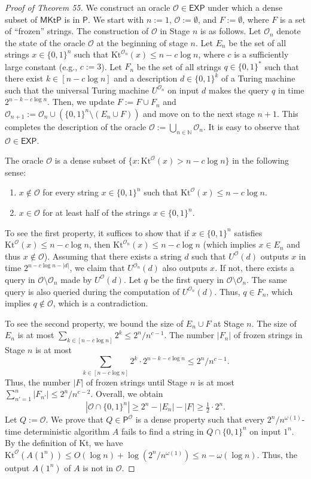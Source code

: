 \documentclass[10pt,a4paper]{article}
\begin{document}
\begin{proof}[Proof of Theorem 55]
We construct an oracle $\mathcal O\in\mathsf{EXP}$ under which a dense subset of $\mathsf{MKtP}$ is in $\mathsf P$. We start with $n:=1$, $\mathcal O:=\emptyset$, and $F:=\emptyset$, where $F$ is a set of ``frozen'' strings. The construction of $\mathcal O$ in Stage $n$ is as follows. Let $\mathcal O_n$ denote the state of the oracle $\mathcal O$ at the beginning of stage $n$. Let $E_n$ be the set of all strings $x\in\{0,1\}^n$ such that $\mathrm{Kt}^{\mathcal O_n}(x)\leq n-c\log n$, where $c$ is a sufficiently large constant (e.g., $c:=3$). Let $F_n$ be the set of all strings $q\in\{0,1\}^*$ such that there exist $k\in[n-c\log n]$ and a description $d\in\{0,1\}^k$ of a Turing machine such that the universal Turing machine $U^{\mathcal O_n}$ on input $d$ makes the query $q$ in time $2^{n-k-c\log n}$. Then, we update $F:=F\cup F_n$ and $\mathcal O_{n+1}:=\mathcal O_n\cup(\{0,1\}^n\setminus(E_n\cup F))$ and move on to the next stage $n+1$. This completes the description of the oracle $\mathcal O:=\bigcup_{n\in\mathbb N}\mathcal O_n$. It is easy to observe that $\mathcal O\in\mathsf{EXP}$.

The oracle $\mathcal O$ is a dense subset of $\{x:\mathrm{Kt}^{\mathcal O}(x)>n-c\log n\}$ in the following sense:
\begin{enumerate}
\item $x\notin\mathcal O$ for every string $x\in\{0,1\}^n$ such that $\mathrm{Kt}^{\mathcal O}(x)\leq n-c\log n$.
\item $x\in\mathcal O$ for at least half of the strings $x\in\{0,1\}^n$.
\end{enumerate}
To see the first property, it suffices to show that if $x\in\{0,1\}^n$ satisfies $\mathrm{Kt}^{\mathcal O}(x)\leq n-c\log n$, then $\mathrm{Kt}^{\mathcal O_n}(x)\leq n-c\log n$ (which implies $x\in E_n$ and thus $x\notin\mathcal O$). Assuming that there exists a string $d$ such that $U^{\mathcal O}(d)$ outputs $x$ in time $2^{n-c\log n-|d|}$, we claim that $U^{\mathcal O_n}(d)$ also outputs $x$. If not, there exists a query in $\mathcal O\setminus\mathcal O_n$ made by $U^{\mathcal O}(d)$. Let $q$ be the first query in $\mathcal O\setminus\mathcal O_n$. The same query is also queried during the computation of $U^{\mathcal O_n}(d)$. Thus, $q\in F_n$, which implies $q\notin\mathcal O$, which is a contradiction.

To see the second property, we bound the size of $E_n\cup F$ at Stage $n$. The size of $E_n$ is at most $\sum_{k\in[n-c\log n]}2^k\leq2^n/n^{c-1}$. The number $|F_n|$ of frozen strings in Stage $n$ is at most
\[\sum_{k\in[n-c\log n]}2^k\cdot2^{n-k-c\log n}\leq2^n/n^{c-1}.\]
Thus, the number $|F|$ of frozen strings until Stage $n$ is at most $\sum_{n'=1}^n|F_{n'}|\leq2^n/n^{c-2}$. Overall, we obtain
\[|\mathcal O\cap\{0,1\}^n|\geq2^n-|E_n|-|F|\geq\tfrac12\cdot2^n.\]
Let $Q:=\mathcal O$. We prove that $Q\in\mathsf P^{\mathcal O}$ is a dense property such that every $2^n/n^{\omega(1)}$-time deterministic algorithm $A$ fails to find a string in $Q\cap\{0,1\}^n$ on input $1^n$. By the definition of Kt, we have $\mathrm{Kt}^{\mathcal O}(A(1^n))\leq O(\log n)+\log(2^n/n^{\omega(1)})\leq n-\omega(\log n)$. Thus, the output $A(1^n)$ of $A$ is not in $\mathcal O$.


\end{proof}
\end{document}

